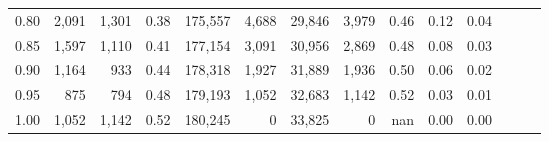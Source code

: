 \begin{tabular}{rrrrrrrrrrrrrr}
0.80 &   2,091 &  1,301 &  0.38 &  175,557 &    4,688 &  29,846 &   3,979 &  0.46 &  0.12 &      0.04 \\
0.85 &   1,597 &  1,110 &  0.41 &  177,154 &    3,091 &  30,956 &   2,869 &  0.48 &  0.08 &      0.03 \\
0.90 &   1,164 &    933 &  0.44 &  178,318 &    1,927 &  31,889 &   1,936 &  0.50 &  0.06 &      0.02 \\
0.95 &     875 &    794 &  0.48 &  179,193 &    1,052 &  32,683 &   1,142 &  0.52 &  0.03 &      0.01 \\
1.00 &   1,052 &  1,142 &  0.52 &  180,245 &        0 &  33,825 &       0 &   nan &  0.00 &      0.00 \\
\bottomrule
\end{tabular}
